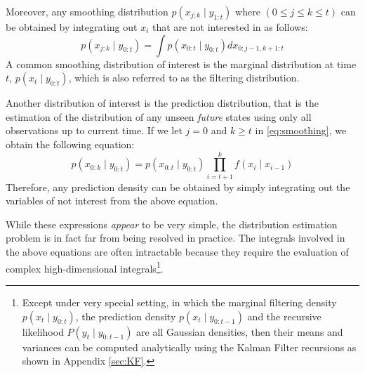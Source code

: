Moreover, any smoothing distribution $p(x_{j:k} \mid y_{1:t})$ where $(0 \leq j \leq k\leq t)$ can be obtained by integrating out $x_i$ that are not interested in as follows:
\begin{equation}
  p(x_{j:k} \mid y_{0:t}) = \int p(x_{0:t} \mid y_{0:t}) dx_{0:j-1, k+1:t}
\label{eq:smoothing}
\end{equation}
A common smoothing distribution of interest is the marginal distribution at time $t$, $p(x_t \mid y_{0:t})$, which is also referred to as the filtering distribution.

Another distribution of interest is  the prediction distribution, that is the estimation of the distribution of any unseen \emph{future} states using only all observations up to current time. If we let $j = 0$ and $k \geq t$ in \eqref{eq:smoothing}, we obtain the following equation:
\begin{equation}
  p(x_{0:k} \mid y_{0:t}) = p(x_{0:t} \mid y_{0:t}) \prod^k_{i=t+1} f(x_i \mid x_{i-1})
\end{equation}
Therefore, any prediction density can be obtained by simply integrating out the variables of not interest from the above equation.

While these expressions \emph{appear} to be very simple, the distribution estimation problem is in fact far from being resolved in practice. The integrals involved in the above equations are often intractable because they require the evaluation of complex high-dimensional integrals\footnote{Except under very special setting, in which the marginal filtering density $p(x_t \mid y_{0:t})$, the prediction density $p(x_t \mid y_{0:t-1})$ and the recursive likelihood $P(y_t \mid y_{0:t-1})$ are all Gaussian densities, then their means and variances can be computed analytically using the Kalman Filter recursions as shown in Appendix \ref{sec:KF}.}. 

